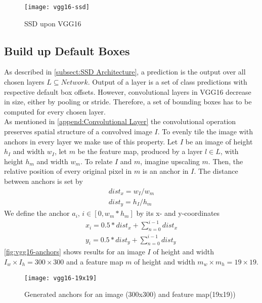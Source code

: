
\begin{figure}[ht]
    \centering
    \texttt{[image: vgg16-ssd]}
    \caption{SSD upon VGG16}
    \label{fig:ssd-vgg}
\end{figure}

\subsection{Build up Default Boxes}\label{subsect:Build up Default Boxes}
As described in \autoref{subsect:SSD Architecture}, a prediction is the output 
over all chosen \glspl{layer} \(L\subseteq Network\). Output of a \gls{layer} is 
a set of class predictions with respective default box offsets. However, 
convolutional \glspl{layer} in VGG16 decrease in size, either by pooling or 
stride. Therefore, a set of bounding boxes has to be computed for every chosen 
\gls{layer}.\\

 
As mentioned in \autoref{append:Convolutional Layer} the convolutional 
operation preserves spatial structure of a convolved image \(I\). To evenly 
tile the image with \glspl{anchor} in every \gls{layer} we make use of this property. 
Let \(I\) be an image of height \(h_I\) and width \(w_I\), let \(m\) be the 
\gls{feature map}, produced by a \gls{layer} \(l\in L\), with height \(h_m\) and
width \(w_m\). To relate \(I\) and \(m\), imagine upscaling \(m\). Then, 
the relative position of every original pixel in \(m\) is an \gls{anchor} in 
\(I\). The distance between
\glspl{anchor} is set by 
\begin{gather}
    dist_x=w_I/w_m\\
    dist_y=h_I/h_m
\end{gather}
We define the anchor \(a_i\), \(i\in [0, w_m*h_m]\) by its x- and y-coordinates 
\begin{gather}
    x_i=0.5*dist_x + \sum_{n=0}^{i-1} dist_x\\
    y_i=0.5*dist_y + \sum_{n=0}^{i-1} dist_y
\end{gather}
\autoref{fig:vgg16-anchors} shows results for an image \(I\) of height and width
\(I_w\times I_h=300\times 300\) and a \gls{feature map} \(m\) of height and
width \(m_w\times m_h=19\times 19\).
\begin{figure}[ht]
    \centering
    \texttt{[image: vgg16-19x19]}
    \caption{Generated anchors for an image (300x300) and \gls{feature map}(19x19))}
    \label{fig:vgg16-anchors}
\end{figure}

